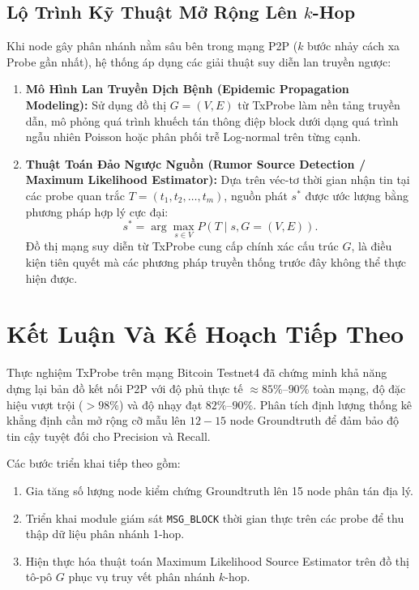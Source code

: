 \documentclass[11pt,a4paper]{article}
\begin{document}
\subsection{Lộ Trình Kỹ Thuật Mở Rộng Lên \texorpdfstring{$k$}{k}-Hop}
Khi node gây phân nhánh nằm sâu bên trong mạng P2P ($k$ bước nhảy cách xa Probe gần nhất), hệ thống áp dụng các giải thuật suy diễn lan truyền ngược:
\begin{enumerate}
    \item \textbf{Mô Hình Lan Truyền Dịch Bệnh (Epidemic Propagation Modeling):} 
    Sử dụng đồ thị $G=(V,E)$ từ TxProbe làm nền tảng truyền dẫn, mô phỏng quá trình khuếch tán thông điệp block dưới dạng quá trình ngẫu nhiên Poisson hoặc phân phối trễ Log-normal trên từng cạnh.
    \item \textbf{Thuật Toán Đảo Ngược Nguồn (Rumor Source Detection / Maximum Likelihood Estimator):}
    Dựa trên véc-tơ thời gian nhận tin tại các probe quan trắc $T = (t_1, t_2, \dots, t_m)$, nguồn phát $s^*$ được ước lượng bằng phương pháp hợp lý cực đại:
    \begin{equation}
        s^* = \arg\max_{s \in V} P(T \mid s, G=(V, E)).
    \end{equation}
    Đồ thị mạng suy diễn từ TxProbe cung cấp chính xác cấu trúc $G$, là điều kiện tiên quyết mà các phương pháp truyền thống trước đây không thể thực hiện được.
\end{enumerate}

\section{Kết Luận Và Kế Hoạch Tiếp Theo}
Thực nghiệm TxProbe trên mạng Bitcoin Testnet4 đã chứng minh khả năng dựng lại bản đồ kết nối P2P với độ phủ thực tế $\approx 85\%$--$90\%$ toàn mạng, độ đặc hiệu vượt trội ($>98\%$) và độ nhạy đạt $82\%$--$90\%$. Phân tích định lượng thống kê khẳng định cần mở rộng cỡ mẫu lên $12 - 15$ node Groundtruth để đảm bảo độ tin cậy tuyệt đối cho Precision và Recall.

Các bước triển khai tiếp theo gồm:
\begin{enumerate}
    \item Gia tăng số lượng node kiểm chứng Groundtruth lên 15 node phân tán địa lý.
    \item Triển khai module giám sát \texttt{MSG\_BLOCK} thời gian thực trên các probe để thu thập dữ liệu phân nhánh 1-hop.
    \item Hiện thực hóa thuật toán Maximum Likelihood Source Estimator trên đồ thị tô-pô $G$ phục vụ truy vết phân nhánh $k$-hop.
\end{enumerate}
\end{document}

